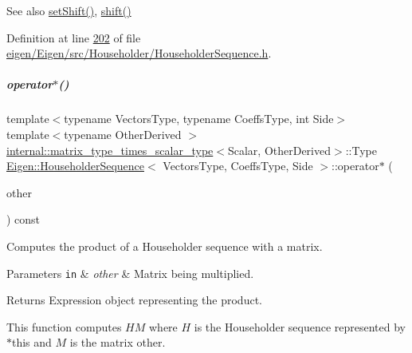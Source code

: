 \begin{DoxySeeAlso}{See also}
\hyperlink{group___householder___module_a2d8d996ce1085fd977850988735739f0}{set\+Shift()}, \hyperlink{group___householder___module_a34482bfad5563fd8a8a4264db76ac917}{shift()} 
\end{DoxySeeAlso}


Definition at line \hyperlink{eigen_2_eigen_2src_2_householder_2_householder_sequence_8h_source_l00202}{202} of file \hyperlink{eigen_2_eigen_2src_2_householder_2_householder_sequence_8h_source}{eigen/\+Eigen/src/\+Householder/\+Householder\+Sequence.\+h}.

\mbox{\label{group___householder___module_ac57e5a22f1646e04a4f8b4cba3825928}} 
\subparagraph{\texorpdfstring{operator$\ast$()}{operator*()}\hspace{0.1cm}{\footnotesize\ttfamily [1/2]}}
{\footnotesize\ttfamily template$<$typename Vectors\+Type, typename Coeffs\+Type, int Side$>$ \\
template$<$typename Other\+Derived $>$ \\
\hyperlink{struct_eigen_1_1internal_1_1matrix__type__times__scalar__type}{internal\+::matrix\+\_\+type\+\_\+times\+\_\+scalar\+\_\+type}$<$Scalar, Other\+Derived$>$\+::Type \hyperlink{group___householder___module_class_eigen_1_1_householder_sequence}{Eigen\+::\+Householder\+Sequence}$<$ Vectors\+Type, Coeffs\+Type, Side $>$\+::operator$\ast$ (\begin{DoxyParamCaption}\item[{const \hyperlink{group___core___module_class_eigen_1_1_matrix_base}{Matrix\+Base}$<$ Other\+Derived $>$ \&}]{other }\end{DoxyParamCaption}) const\hspace{0.3cm}{\ttfamily [inline]}}



Computes the product of a Householder sequence with a matrix. 


\begin{DoxyParams}[1]{Parameters}
\mbox{\tt in}  & {\em other} & Matrix being multiplied. \\
\hline
\end{DoxyParams}
\begin{DoxyReturn}{Returns}
Expression object representing the product.
\end{DoxyReturn}
This function computes $ HM $ where $ H $ is the Householder sequence represented by {\ttfamily $\ast$this} and $ M $ is the matrix {\ttfamily other}. 

